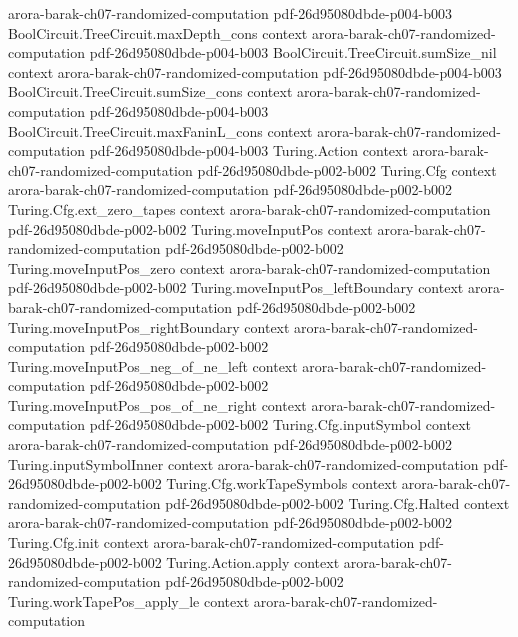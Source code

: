 \begin{theorem}
  {arora-barak-ch07-randomized-computation}
  {pdf-26d95080dbde-p004-b003}
\proofstep
  {BoolCircuit.TreeCircuit.maxDepth_cons}
  {context}
  {arora-barak-ch07-randomized-computation}
  {pdf-26d95080dbde-p004-b003}
\proofstep
  {BoolCircuit.TreeCircuit.sumSize_nil}
  {context}
  {arora-barak-ch07-randomized-computation}
  {pdf-26d95080dbde-p004-b003}
\proofstep
  {BoolCircuit.TreeCircuit.sumSize_cons}
  {context}
  {arora-barak-ch07-randomized-computation}
  {pdf-26d95080dbde-p004-b003}
\proofstep
  {BoolCircuit.TreeCircuit.maxFaninL_cons}
  {context}
  {arora-barak-ch07-randomized-computation}
  {pdf-26d95080dbde-p004-b003}
\proofstep
  {Turing.Action}
  {context}
  {arora-barak-ch07-randomized-computation}
  {pdf-26d95080dbde-p002-b002}
\proofstep
  {Turing.Cfg}
  {context}
  {arora-barak-ch07-randomized-computation}
  {pdf-26d95080dbde-p002-b002}
\proofstep
  {Turing.Cfg.ext_zero_tapes}
  {context}
  {arora-barak-ch07-randomized-computation}
  {pdf-26d95080dbde-p002-b002}
\proofstep
  {Turing.moveInputPos}
  {context}
  {arora-barak-ch07-randomized-computation}
  {pdf-26d95080dbde-p002-b002}
\proofstep
  {Turing.moveInputPos_zero}
  {context}
  {arora-barak-ch07-randomized-computation}
  {pdf-26d95080dbde-p002-b002}
\proofstep
  {Turing.moveInputPos_leftBoundary}
  {context}
  {arora-barak-ch07-randomized-computation}
  {pdf-26d95080dbde-p002-b002}
\proofstep
  {Turing.moveInputPos_rightBoundary}
  {context}
  {arora-barak-ch07-randomized-computation}
  {pdf-26d95080dbde-p002-b002}
\proofstep
  {Turing.moveInputPos_neg_of_ne_left}
  {context}
  {arora-barak-ch07-randomized-computation}
  {pdf-26d95080dbde-p002-b002}
\proofstep
  {Turing.moveInputPos_pos_of_ne_right}
  {context}
  {arora-barak-ch07-randomized-computation}
  {pdf-26d95080dbde-p002-b002}
\proofstep
  {Turing.Cfg.inputSymbol}
  {context}
  {arora-barak-ch07-randomized-computation}
  {pdf-26d95080dbde-p002-b002}
\proofstep
  {Turing.inputSymbolInner}
  {context}
  {arora-barak-ch07-randomized-computation}
  {pdf-26d95080dbde-p002-b002}
\proofstep
  {Turing.Cfg.workTapeSymbols}
  {context}
  {arora-barak-ch07-randomized-computation}
  {pdf-26d95080dbde-p002-b002}
\proofstep
  {Turing.Cfg.Halted}
  {context}
  {arora-barak-ch07-randomized-computation}
  {pdf-26d95080dbde-p002-b002}
\proofstep
  {Turing.Cfg.init}
  {context}
  {arora-barak-ch07-randomized-computation}
  {pdf-26d95080dbde-p002-b002}
\proofstep
  {Turing.Action.apply}
  {context}
  {arora-barak-ch07-randomized-computation}
  {pdf-26d95080dbde-p002-b002}
\proofstep
  {Turing.workTapePos_apply_le}
  {context}
  {arora-barak-ch07-randomized-computation}

\end{theorem}
